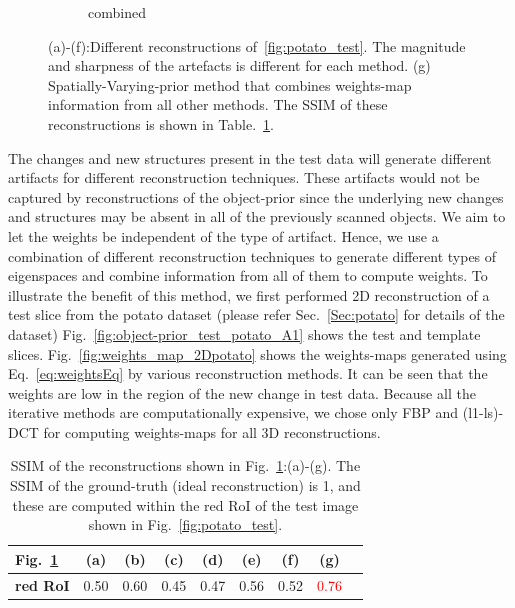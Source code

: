 \documentclass[journal]{IEEEtran}
\begin{document}
\begin{figure}[!h]
\begin{subfigure}[b]{0.24\linewidth}
        \caption{combined}
     \end{subfigure}
      \caption{(a)-(f):Different reconstructions of~\ref{fig:potato_test}. The magnitude and sharpness of the artefacts is different for each method. (g) Spatially-Varying-prior method that combines weights-map information from all other methods. The SSIM of these reconstructions is shown in Table.~\ref{table:potato_2D_ssim}.} 
\label{fig:reconstructions_diff_methods}
\end{figure}

The changes and new structures present in the test data will generate
different artifacts for different reconstruction techniques. These
artifacts would not be captured by reconstructions of the object-prior
since the underlying new changes and structures may be absent in all
of the previously scanned objects. We aim to let the weights be
independent of the type of artifact. Hence, we use a combination of
different reconstruction techniques to generate different types of
eigenspaces and combine information from all of them to compute
weights. To illustrate the benefit of this method, we first performed
2D reconstruction of a test slice from the potato dataset (please
refer Sec.~\ref{Sec:potato} for details of the dataset)
Fig.~\ref{fig:object-prior_test_potato_A1} shows the test and template
slices. Fig.~\ref{fig:weights_map_2Dpotato} shows the weights-maps
generated using Eq.~\ref{eq:weightsEq} by various reconstruction
methods. It can be seen that the weights are low in the region of the
new change in test data. Because all the iterative methods are
computationally expensive, we chose only FBP and (l1-ls)-DCT for
computing weights-maps for all 3D reconstructions.
\begin{table}[!h]
  \centering
\caption{SSIM of the reconstructions shown in Fig.~\ref{fig:reconstructions_diff_methods}:(a)-(g). The SSIM of the ground-truth (ideal reconstruction) is 1, and these are computed within the red RoI of the test image shown in Fig.~\ref{fig:potato_test}.}
\begin{tabular}{|l|c|c|c|c|c|c|c|c|}
\hline
 Fig.~\ref{fig:reconstructions_diff_methods}  & \textbf{(a)} & \textbf{(b)} & \textbf{(c)} & \textbf{(d)} & \textbf{(e)} & \textbf{(f)} &  \textbf{(g)} \\\hline
\textbf{red RoI}  & 0.50 & 0.60  & 0.45 & 0.47 & 0.56 & 0.52 & \textcolor{red}{0.76} \\ \hline
\end{tabular}
\label{table:potato_2D_ssim}
\end{table}
\end{document}
